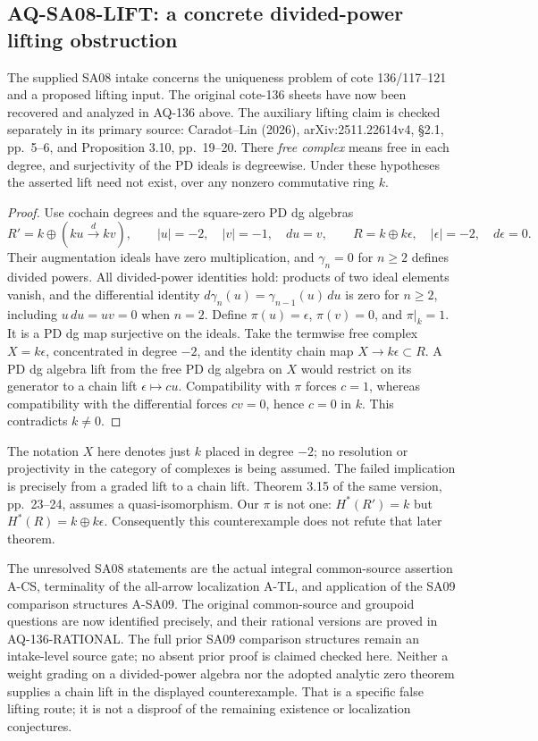 \documentclass[11pt,a4paper]{article}
\theoremstyle{definition}\newtheorem{definition}[theorem]{Definition}
\theoremstyle{remark}\newtheorem{remark}[theorem]{Remark}
\begin{document}
\subsection{AQ-SA08-LIFT: a concrete divided-power lifting obstruction}
The supplied SA08 intake concerns the uniqueness problem
of cote 136/117--121 and a proposed lifting input.
The original cote-136 sheets have now been recovered and
analyzed in AQ-136 above.  The auxiliary lifting claim
is checked separately in its primary source: Caradot--Lin (2026),
arXiv:2511.22614v4, \S2.1, pp.~5--6, and
Proposition 3.10, pp.~19--20.
There \emph{free complex} means free in each degree,
and surjectivity of the PD ideals is degreewise.
Under these hypotheses the asserted lift need not exist,
over any nonzero commutative ring $k$.
\begin{proof}
Use cochain degrees and the square-zero PD dg algebras
\[
 R'=k\oplus(ku\xrightarrow{\,d\,}kv),\qquad
 |u|=-2,\quad |v|=-1,\quad du=v,
 \qquad R=k\oplus k\epsilon,\quad|\epsilon|=-2,\quad d\epsilon=0.
\]
Their augmentation ideals have zero multiplication,
and $\gamma_n=0$ for $n\geq2$ defines divided powers.
All divided-power identities hold: products of two
ideal elements vanish, and the differential identity
$d\gamma_n(u)=\gamma_{n-1}(u)\,du$ is zero for $n\geq2$,
including $u\,du=uv=0$ when $n=2$.
Define $\pi(u)=\epsilon$, $\pi(v)=0$, and $\pi|_k=1$.
It is a PD dg map surjective on the ideals.
Take the termwise free complex $X=k\epsilon$,
concentrated in degree $-2$, and the identity chain
map $X\to k\epsilon\subset R$.
A PD dg algebra lift from the free PD dg algebra
on $X$ would restrict on its generator to a chain
lift $\epsilon\mapsto cu$.
Compatibility with $\pi$ forces $c=1$, whereas
compatibility with the differential forces $cv=0$,
hence $c=0$ in $k$. This contradicts $k\ne0$.
\end{proof}
The notation $X$ here denotes just $k$ placed in
degree $-2$; no resolution or projectivity in the
category of complexes is being assumed.
The failed implication is precisely from a graded
lift to a chain lift. Theorem 3.15 of the same
version, pp.~23--24, assumes a quasi-isomorphism.
Our $\pi$ is not one:
$H^*(R')=k$ but $H^*(R)=k\oplus k\epsilon$.
Consequently this counterexample does not refute
that later theorem.

The unresolved SA08 statements are the actual
integral common-source assertion A-CS, terminality
of the all-arrow localization A-TL, and application
of the SA09 comparison structures A-SA09.
The original common-source and groupoid questions are now
identified precisely, and their rational versions are proved
in AQ-136-RATIONAL.  The full prior SA09 comparison
structures remain an intake-level source gate; no absent
prior proof is claimed checked here.
Neither a weight grading on a divided-power algebra
nor the adopted analytic zero theorem supplies a
chain lift in the displayed counterexample.
That is a specific false lifting route; it is not
a disproof of the remaining existence or
localization conjectures.
\end{document}
